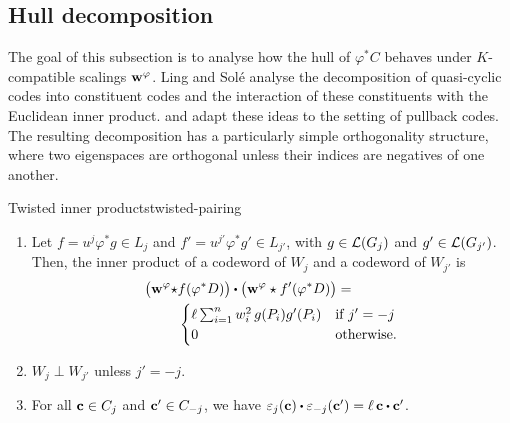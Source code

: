 \documentclass[twocolumn, 11pt]{scrartcl}
\begin{document}
\subsection{Hull decomposition} \label{subsection:hull-decomposition}

The goal of this subsection is to analyse how the hull of $\varphi^*C$ behaves under $K$-compatible scalings $\mathbf{w}^\varphi$. Ling and Sol\'e \cite[Prop.~4.1]{ling2001algebraic} analyse the decomposition of quasi-cyclic codes into constituent codes and the interaction of these constituents with the Euclidean inner product.  and  adapt these ideas to the setting of pullback codes. The resulting decomposition has a particularly simple orthogonality structure, where two eigenspaces are orthogonal unless their indices are negatives of one another.

\begin{lemma}{Twisted inner products}{twisted-pairing}
    \begin{enumerate}
        \item \label{enum:tp-formula} Let $f=u^j\varphi^*g\in L_j$ and $f'=u^{j'}\varphi^*g'\in L_{j'}$, with $g\in\mathcal{L}(G_j)$ and $g'\in\mathcal{L}(G_{j'})$. Then, the inner product of a codeword of $W_j$ and a codeword of $W_{j'}$ is
        \begin{align*}
            \pa[\big]{\bfw^\varphi \star &f(\varphi^*D)} \dotpr \pa[\big]{\bfw^\varphi\star f'(\varphi^*D)}= \\
            &\begin{cases}
            \textstyle \ell\sum_{i=1}^n w_i^2\,g(P_i)g'(P_i) &\text{if }j'=-j \\
            0 &\text{otherwise.}
            \end{cases}
        \end{align*}
        \item \label{enum:tp-orth} $W_j\perp W_{j'}$ unless $j'=-j$.
        \item \label{enum:tp-eps} For all $\mathbf{c}\in C_j$ and $\mathbf{c}'\in C_{-j}$, we have $\eps_j(\bfc)\dotpr\eps_{-j}(\bfc')=\ell\,\bfc\dotpr\bfc'$.
    \end{enumerate}
\end{lemma}
\end{document}
